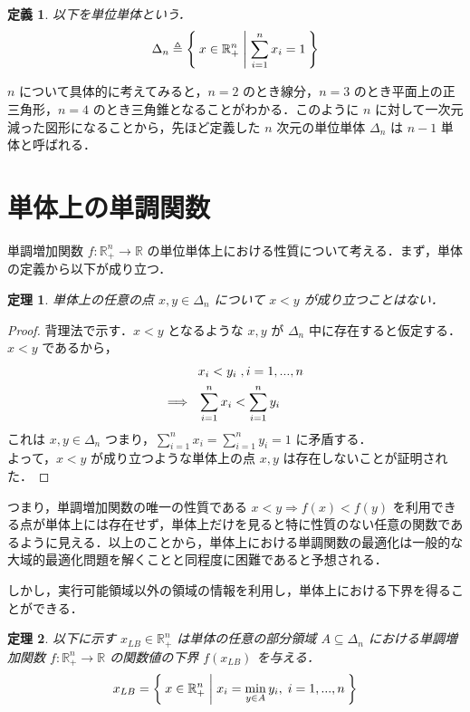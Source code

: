 \documentclass[a4paper,11pt]{jreport}
\newtheorem{definition}{定義}
\newtheorem{theorem}{定理}
\begin{document}
\begin{definition}
以下を単位単体という．
$$ \Delta_n \triangleq \Set{ x \in \mathbb{R}^n_{+} | \sum_{i=1}^{n} x_i = 1 } $$
\end{definition}

$ n $ について具体的に考えてみると，$ n=2 $ のとき線分，$ n=3 $ のとき平面上の正三角形，$ n=4 $ のとき三角錐となることがわかる．このように $n$ に対して一次元減った図形になることから，先ほど定義した $n$ 次元の単位単体 $ \Delta_n $ は $ n-1 $ 単体と呼ばれる．

\section{単体上の単調関数}

単調増加関数 $ f : \mathbb{R}^n_{+} \to \mathbb{R} $ の単位単体上における性質について考える．まず，単体の定義から以下が成り立つ．\\

\begin{theorem}
単体上の任意の点 $ x, y \in \Delta_n $ について $ x < y $ が成り立つことはない．
\end{theorem}

\begin{proof}
背理法で示す．$ x < y $ となるような $ x, y $ が $ \Delta_n $ 中に存在すると仮定する．\\
$ x < y $ であるから，
\begin{align}
& x_i < y_i \;, i = 1, ..., n \notag \\
\Longrightarrow \hspace{8pt} & \sum_{i=1}^n x_i < \sum_{i=1}^n y_i \notag
\end{align}
これは $ x, y \in \Delta_n $ つまり，$ \sum_{i=1}^n x_i = \sum_{i=1}^n y_i = 1 $ に矛盾する．\\
よって，$ x < y $ が成り立つような単体上の点 $ x, y $ は存在しないことが証明された．
\end{proof}

つまり，単調増加関数の唯一の性質である $ x < y \Rightarrow f(x) < f(y) $ を利用できる点が単体上には存在せず，単体上だけを見ると特に性質のない任意の関数であるように見える．以上のことから，単体上における単調関数の最適化は一般的な大域的最適化問題を解くことと同程度に困難であると予想される．\par
しかし，実行可能領域以外の領域の情報を利用し，単体上における下界を得ることができる．\\

\begin{theorem}\label{lower_bound_of_monotonic_function}
以下に示す $ x_{LB} \in \mathbb{R}^n_{+} $ は単体の任意の部分領域 $ A \subseteq \Delta_n $ における単調増加関数 $ f :  \mathbb{R}^n_{+} \to \mathbb{R} $ の関数値の下界 $ f(x_{LB}) $ を与える．
$$ x_{LB} = \Set{ x \in \mathbb{R}^n_{+} | x_i = \min_{y \in A } y_i, \; i = 1, ..., n } $$
\end{theorem}
\end{document}
